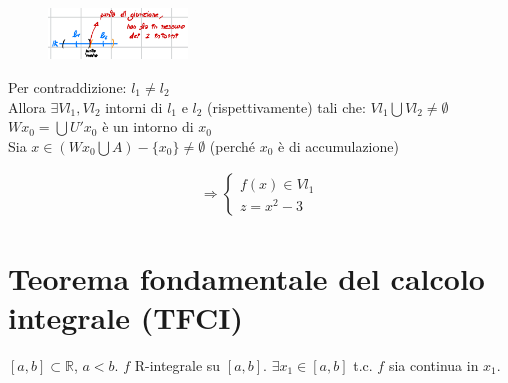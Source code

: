 \documentclass{article}
\newcommand{\R}{\mathbb{R}}
\begin{document}
\begin{flushleft}
\begin{figure}[h]
    \centering
    \includegraphics[width=10em]{./images/unicitaLimite.PNG}
\end{figure}

Per contraddizione: $l_1 \neq l_2$
\\Allora $\exists Vl_1, Vl_2$ intorni di $l_1$ e $l_2$ (rispettivamente) tali che: $Vl_1 \bigcup Vl_2 \neq \emptyset$
\\$Wx_0 = \bigcup U'x_0$ è un intorno di $x_0$
\\Sia $x \in(Wx_0 \bigcup A) - \{x_0\} \neq \emptyset$ (perché $x_0$ è di accumulazione)

\begin{align*}
    \Rightarrow
    \begin{cases}
        f(x) \in Vl_1 \\
        z = x^2 - 3
    \end{cases}
\end{align*}


\section{Teorema fondamentale del calcolo integrale (TFCI)}
 $[a,b] \subset \R$, $a < b$. $f$ R-integrale su $[a,b]$.
 $\exists x_1 \in [a,b]$ t.c. $f$ sia continua in $x_1$.


\end{flushleft}
\end{document}
